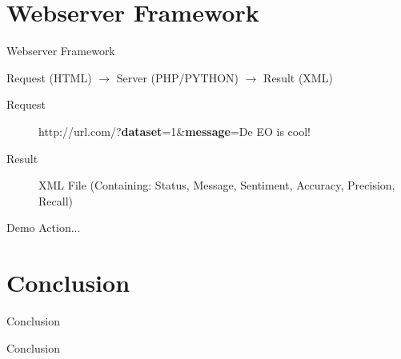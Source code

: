 \documentclass{beamer}
\begin{document}
\section{Webserver Framework}
\begin{frame}{Webserver Framework}
\begin{center}
Request (HTML) $\rightarrow$ Server (PHP/PYTHON) $\rightarrow$ Result (XML)
\end{center}

\begin{description}
\item[Request] http://url.com/?\textbf{dataset}=1\&\textbf{message}=De EO is cool!\\
\item[Result] XML File (Containing: Status, Message, Sentiment, Accuracy, Precision, Recall)
\end{description}
\end{frame}
\begin{frame}{Demo}
Action...
\end{frame}

\section{Conclusion}

\begin{frame}{Conclusion}
\end{frame}
\begin{frame}{Conclusion}
\end{frame}
\end{document}
